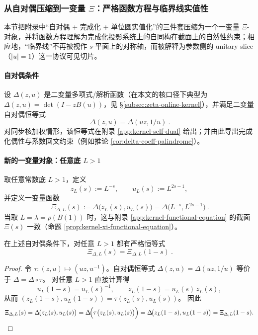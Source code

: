 \subsubsection{从自对偶压缩到一变量 \texorpdfstring{$\Xi$}{Xi}：严格函数方程与临界线实值性}\label{subsec:xi-from-self-dual}
本节把附录中“自对偶 + 完成化 + 单位圆实值化”的三件套压缩为一个一变量 \(\Xi\)-对象，并将函数方程理解为完成化投影系统上的自同构在截面上的自然性约束；相应地，“临界线”不再被视作 \(s\)-平面上的对称轴，而被解释为参数侧的 unitary slice（\(|u|=1\)）这一协议可见切片。

\paragraph{自对偶条件}
设 \(\Delta(z,u)\) 是二变量多项式/解析函数（在本文的核口径下典型为
\(\Delta(z,u)=\det(I-zB(u))\)，见 \S\ref{subsec:zeta-online-kernel}），并满足二变量自对偶恒等式
\[
\boxed{\ \Delta(z,u)=\Delta(uz,1/u)\ }.
\]
对同步核加权情形，该恒等式在附录 \ref{app:kernel-self-dual} 给出；并由此导出完成化偶性与系数回文约束（例如推论 \ref{cor:delta-coeff-palindrome}）。

\paragraph{新的一变量对象：任意底 \texorpdfstring{$L>1$}{L>1}}
取任意常数底 \(L>1\)，定义
\[
z_L(s):=L^{-s},\qquad u_L(s):=L^{2s-1},
\]
并定义一变量函数
\[
\boxed{\ \Xi_{\Delta,L}(s):=\Delta\!\bigl(z_L(s),u_L(s)\bigr)=\Delta\!\bigl(L^{-s},L^{2s-1}\bigr)\ }.
\]
当取 \(L=\lambda=\rho(B(1))\) 时，这与附录 \ref{app:kernel-functional-equation} 的截面 \(\Xi(s)\) 一致（命题 \ref{prop:kernel-xi-functional-equation}）。

\begin{proposition}\label{prop:xi-delta-L-functional-equation}
在上述自对偶条件下，对任意 \(L>1\) 都有严格恒等式
\[
\boxed{\ \Xi_{\Delta,L}(s)=\Xi_{\Delta,L}(1-s)\ }.
\]
\end{proposition}
\begin{proof}
令 \(\tau:(z,u)\mapsto(uz,u^{-1})\)。自对偶恒等式 \(\Delta(z,u)=\Delta(uz,1/u)\) 等价于 \(\Delta=\Delta\circ\tau\)。
对任意 \(L>1\) 直接计算得
\[
u_L(1-s)=u_L(s)^{-1},\qquad z_L(1-s)=u_L(s)\,z_L(s),
\]
从而 \((z_L(1-s),u_L(1-s))=\tau(z_L(s),u_L(s))\)。
因此
\[
\Xi_{\Delta,L}(s)
=\Delta\!\bigl(z_L(s),u_L(s)\bigr)
=\Delta\!\Bigl(\tau\bigl(z_L(s),u_L(s)\bigr)\Bigr)
=\Delta\!\bigl(z_L(1-s),u_L(1-s)\bigr)
=\Xi_{\Delta,L}(1-s).
\]
\end{proof}

